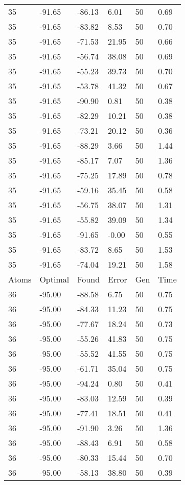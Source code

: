\documentclass{report}
\begin{document}
\begin{appendix}
\begin{longtable}{llllll}
35 & -91.65 & -86.13 & 6.01 & 50 & 0.69 \\
35 & -91.65 & -83.82 & 8.53 & 50 & 0.70 \\
35 & -91.65 & -71.53 & 21.95 & 50 & 0.66 \\
35 & -91.65 & -56.74 & 38.08 & 50 & 0.69 \\
35 & -91.65 & -55.23 & 39.73 & 50 & 0.70 \\
35 & -91.65 & -53.78 & 41.32 & 50 & 0.67 \\
35 & -91.65 & -90.90 & 0.81 & 50 & 0.38 \\
35 & -91.65 & -82.29 & 10.21 & 50 & 0.38 \\
35 & -91.65 & -73.21 & 20.12 & 50 & 0.36 \\
35 & -91.65 & -88.29 & 3.66 & 50 & 1.44 \\
35 & -91.65 & -85.17 & 7.07 & 50 & 1.36 \\
35 & -91.65 & -75.25 & 17.89 & 50 & 0.78 \\
35 & -91.65 & -59.16 & 35.45 & 50 & 0.58 \\
35 & -91.65 & -56.75 & 38.07 & 50 & 1.31 \\
35 & -91.65 & -55.82 & 39.09 & 50 & 1.34 \\
35 & -91.65 & -91.65 & -0.00 & 50 & 0.55 \\
35 & -91.65 & -83.72 & 8.65 & 50 & 1.53 \\
35 & -91.65 & -74.04 & 19.21 & 50 & 1.58 \\
Atoms & Optimal & Found & Error & Gen & Time \\
36 & -95.00 & -88.58 & 6.75 & 50 & 0.75 \\
36 & -95.00 & -84.33 & 11.23 & 50 & 0.75 \\
36 & -95.00 & -77.67 & 18.24 & 50 & 0.73 \\
36 & -95.00 & -55.26 & 41.83 & 50 & 0.75 \\
36 & -95.00 & -55.52 & 41.55 & 50 & 0.75 \\
36 & -95.00 & -61.71 & 35.04 & 50 & 0.75 \\
36 & -95.00 & -94.24 & 0.80 & 50 & 0.41 \\
36 & -95.00 & -83.03 & 12.59 & 50 & 0.39 \\
36 & -95.00 & -77.41 & 18.51 & 50 & 0.41 \\
36 & -95.00 & -91.90 & 3.26 & 50 & 1.36 \\
36 & -95.00 & -88.43 & 6.91 & 50 & 0.58 \\
36 & -95.00 & -80.33 & 15.44 & 50 & 0.70 \\
36 & -95.00 & -58.13 & 38.80 & 50 & 0.39 \\

\end{longtable}
\end{appendix}
\end{document}
